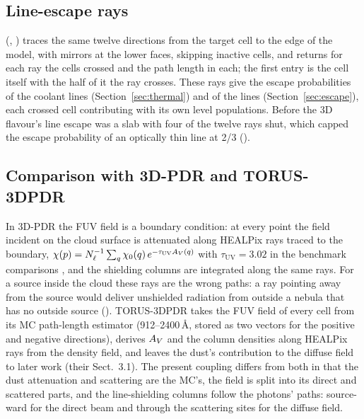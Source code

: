 \subsection{Line-escape rays}
\label{sec:lineRays}

 (, ) traces the
same twelve directions from the target cell to the edge of the model, with
mirrors at the lower faces, skipping inactive cells, and returns for each ray
the cells crossed and the path length in each; the first entry is the cell
itself with the half of it the ray crosses. These rays give the escape
probabilities of the coolant lines (Section~\ref{sec:thermal}) and of the
\Htwo{} lines (Section~\ref{sec:escape}), each crossed cell contributing with
its own level populations. Before  the 3D flavour's line escape
was a slab with four of the twelve rays shut, which capped the escape
probability of an optically thin line at 2/3 ().

\subsection{Comparison with 3D-PDR and TORUS-3DPDR}

In 3D-PDR \citep{Bisbas2012} the FUV field is a boundary condition: at every
point the field incident on the cloud surface is attenuated along HEALPix rays
traced to the boundary, $\chi(p)=N_\ell^{-1}\sum_{q}\chi_0(q)\,e^{-\tau_{\mathrm{UV}}A_{V}(q)}$
with $\tau_{\mathrm{UV}}=3.02$ in the benchmark comparisons
\citep[their Eq.~1]{Bisbas2015}, and the shielding columns are integrated
along the same rays. For a source inside the cloud these rays are the wrong
paths: a ray pointing away from the source would deliver unshielded radiation
from outside a nebula that has no outside source (). TORUS-3DPDR
\citep{Bisbas2015} takes the FUV field of every cell from its MC path-length
estimator (912--2400\,\AA, stored as two vectors for the positive and negative
directions), derives $A_{V}$ and the column densities along HEALPix rays from
the density field, and leaves the dust's contribution to the diffuse field to
later work (their Sect.~3.1). The present coupling differs from both in that the dust
attenuation and scattering are the MC's, the field is split into its direct
and scattered parts, and the line-shielding columns follow the photons'
paths: source-ward for the direct beam and through the scattering sites for
the diffuse field.
